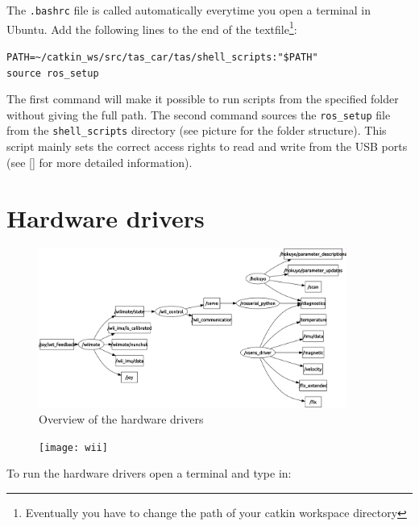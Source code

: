 The \texttt{.bashrc} file is called automatically everytime you open a terminal in Ubuntu.
Add the following lines to the end of the textfile\footnote{Eventually you have to change the path of your catkin workspace directory}: 

\texttt{PATH=\textasciitilde/catkin\_ws/src/tas\_car/tas/shell\_scripts:"\$PATH"}\\
\texttt{source ros\_setup}\\


The first command will make it possible to run scripts from the specified folder without giving the full path. The second command sources the \texttt{ros\_setup} file from the \texttt{shell\_scripts} directory (see picture  for the folder structure). This script mainly sets the correct access rights to read and write from the USB ports (see \ref{} for more detailed information).

\newpage
\section{Hardware drivers}
\label{sec:tas_package_drivers}

\begin{figure}[h]
	\centering
		\includegraphics[width=0.9\textwidth]{diagrams/rqt_hardware}
	\caption{Overview of the hardware drivers}
	\label{fig:rqt_hardware}
\end{figure}

\begin{figure}
  \begin{center}
    \texttt{[image: wii]}
		\label{fig:wii_controller}
  \end{center}	
\end{figure}

To run the hardware drivers open a terminal and type in:

